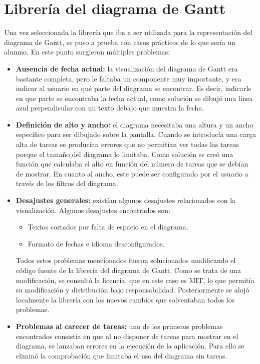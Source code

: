 \section{Librería del diagrama de Gantt}
Una vez seleccionada la librería que iba a ser utilizada para la representación del diagrama de Gantt, se puso a prueba con casos prácticos de lo que sería un alumno. En este punto surgieron múltiples problemas:
\begin{itemize}
    \item \textbf{Ausencia de fecha actual:} la visualización del diagrama de Gantt era bastante completa, pero le faltaba un componente muy importante, y era indicar al usuario en qué parte del diagrama se encontrar. Es decir, indicarle en que parte se encontraba la fecha actual, como solución se dibujó una línea azul perpendicular con un texto debajo que muestra la fecha.
    \item \textbf{Definición de alto y ancho:} el diagrama necesitaba una altura y un ancho específico para ser dibujado sobre la pantalla. Cuando se introducía una carga alta de tareas se producían errores que no permitían ver todas las tareas porque el tamaño del diagrama lo limitaba. Como solución se creó una función que calculaba el alto en función del número de tareas que se debían de mostrar. En cuanto al ancho, este puede ser configurado por el usuario a través de los filtros del diagrama.
    \item \textbf{Desajustes generales:} existían algunos desajustes relacionados con la visualización. Algunos desajustes encontrados son:
    \begin{itemize}
        \item Textos cortados por falta de espacio en el diagrama.
        \item Formato de fechas e idioma desconfigurados.
    \end{itemize}

    Todos estos problemas mencionados fueron solucionados modificando el código fuente de la librería del diagrama de Gantt. Como se trata de una modificación, se consultó la licencia, que en este caso es MIT, lo que permitía su modificación y distribución bajo responsabilidad. Posteriormente se alojó localmente la librería con los nuevos cambios que solventaban todos los problemas.
    \item \textbf{Problemas al carecer de tareas:} uno de los primeros problemas encontrados consistía en que al no disponer de tareas para mostrar en el diagrama, se lanzaban errores en la ejecución de la aplicación. Para ello se eliminó la comprobación que limitaba el uso del diagrama sin tareas.
\end{itemize}

